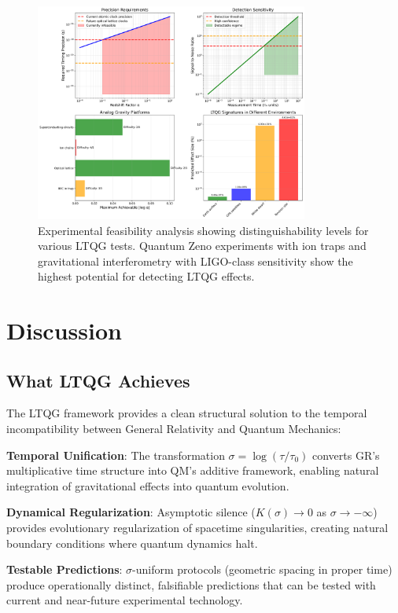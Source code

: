 \documentclass[12pt,a4paper]{article}
\begin{document}
\begin{figure}[H]
\centering
\includegraphics[width=0.8\textwidth]{figs/experimental_feasibility.png}
\caption{Experimental feasibility analysis showing distinguishability levels for various LTQG tests. Quantum Zeno experiments with ion traps and gravitational interferometry with LIGO-class sensitivity show the highest potential for detecting LTQG effects.}
\label{fig:experimental_feasibility}
\end{figure}

\section{Discussion}

\subsection{What LTQG Achieves}

The LTQG framework provides a clean structural solution to the temporal incompatibility between General Relativity and Quantum Mechanics:

\textbf{Temporal Unification}: The transformation $\sigma = \log(\tau/\tau_0)$ converts GR's multiplicative time structure into QM's additive framework, enabling natural integration of gravitational effects into quantum evolution.

\textbf{Dynamical Regularization}: Asymptotic silence ($K(\sigma) \to 0$ as $\sigma \to -\infty$) provides evolutionary regularization of spacetime singularities, creating natural boundary conditions where quantum dynamics halt.

\textbf{Testable Predictions}: $\sigma$-uniform protocols (geometric spacing in proper time) produce operationally distinct, falsifiable predictions that can be tested with current and near-future experimental technology.
\end{document}
